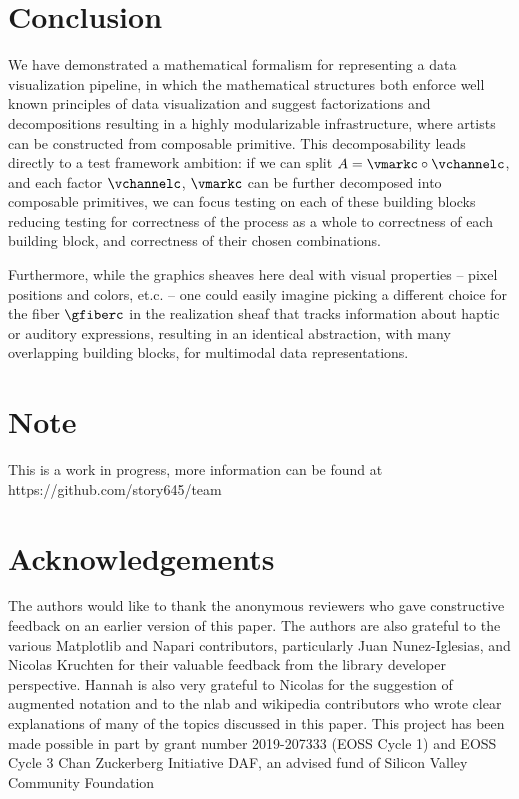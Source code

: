 \documentclass[preprint]{vgtc}
\begin{document}
\section{Conclusion}

We have demonstrated a mathematical formalism for representing a data visualization pipeline, in which the mathematical structures both enforce well known principles of data visualization and suggest factorizations and decompositions resulting in a highly modularizable infrastructure, where artists can be constructed from composable primitive. This decomposability leads directly to a test framework ambition: if we can split $A=\vmarkc\circ\vchannelc$, and each factor $\vchannelc$, $\vmarkc$ can be further decomposed into composable primitives, we can focus testing on each of these building blocks reducing testing for correctness of the process as a whole to correctness of each building block, and correctness of their chosen combinations.

Furthermore, while the graphics sheaves here deal with visual properties -- pixel positions and colors, et.c. -- one could easily imagine picking a different choice for the fiber $\gfiberc$ in the realization sheaf that tracks information about haptic or auditory expressions, resulting in an identical abstraction, with many overlapping building blocks, for multimodal data representations.


\section*{Note}
This is a work in progress, more information can be found at https://github.com/story645/team

\section*{Acknowledgements}
The authors would like to thank the anonymous reviewers who gave constructive feedback on an earlier version of this paper. The authors are also grateful to  the various Matplotlib and Napari contributors, particularly Juan Nunez-Iglesias, and Nicolas Kruchten for their valuable feedback from the library developer perspective. Hannah is also very grateful to Nicolas for the suggestion of augmented notation and to the nlab and wikipedia contributors who wrote clear explanations of many of the topics discussed in this paper. This project has been made possible in part by grant number 2019-207333 (EOSS Cycle 1) and EOSS Cycle 3 Chan Zuckerberg Initiative DAF, an advised fund of Silicon Valley Community Foundation




\end{document}
